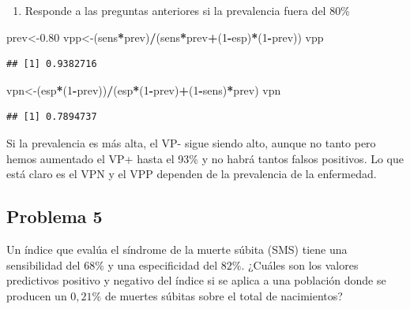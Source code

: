 \documentclass[
]{article}
\newenvironment{Shaded}{\begin{snugshade}}{\end{snugshade}}
\newcommand{\DecValTok}[1]{\textcolor[rgb]{0.00,0.00,0.81}{#1}}
\newcommand{\FloatTok}[1]{\textcolor[rgb]{0.00,0.00,0.81}{#1}}
\newcommand{\NormalTok}[1]{#1}
\newcommand{\OtherTok}[1]{\textcolor[rgb]{0.56,0.35,0.01}{#1}}
\newcommand{\SpecialCharTok}[1]{\textcolor[rgb]{0.81,0.36,0.00}{\textbf{#1}}}
\providecommand{\tightlist}{%
  \setlength{\itemsep}{0pt}\setlength{\parskip}{0pt}}
\begin{document}
\begin{enumerate}
\def\labelenumi{\alph{enumi})}
\setcounter{enumi}{2}
\tightlist
\item
  Responde a las preguntas anteriores si la prevalencia fuera del 80\%
\end{enumerate}

\begin{Shaded}
\begin{Highlighting}[]
\NormalTok{prev}\OtherTok{\textless{}{-}}\FloatTok{0.80}
\NormalTok{vpp}\OtherTok{\textless{}{-}}\NormalTok{(sens}\SpecialCharTok{*}\NormalTok{prev)}\SpecialCharTok{/}\NormalTok{(sens}\SpecialCharTok{*}\NormalTok{prev}\SpecialCharTok{+}\NormalTok{(}\DecValTok{1}\SpecialCharTok{{-}}\NormalTok{esp)}\SpecialCharTok{*}\NormalTok{(}\DecValTok{1}\SpecialCharTok{{-}}\NormalTok{prev))}
\NormalTok{vpp}
\end{Highlighting}
\end{Shaded}

\begin{verbatim}
## [1] 0.9382716
\end{verbatim}

\begin{Shaded}
\begin{Highlighting}[]
\NormalTok{vpn}\OtherTok{\textless{}{-}}\NormalTok{(esp}\SpecialCharTok{*}\NormalTok{(}\DecValTok{1}\SpecialCharTok{{-}}\NormalTok{prev))}\SpecialCharTok{/}\NormalTok{(esp}\SpecialCharTok{*}\NormalTok{(}\DecValTok{1}\SpecialCharTok{{-}}\NormalTok{prev)}\SpecialCharTok{+}\NormalTok{(}\DecValTok{1}\SpecialCharTok{{-}}\NormalTok{sens)}\SpecialCharTok{*}\NormalTok{prev)}
\NormalTok{vpn}
\end{Highlighting}
\end{Shaded}

\begin{verbatim}
## [1] 0.7894737
\end{verbatim}

Si la prevalencia es más alta, el VP- sigue siendo alto, aunque no tanto pero hemos aumentado el VP+ hasta el 93\% y no habrá tantos falsos positivos. Lo que está claro es el VPN y el VPP dependen de la prevalencia de la enfermedad.

\subsection{Problema 5}\label{problema-5}

Un índice que evalúa el síndrome de la muerte súbita (SMS) tiene una sensibilidad del \(68 \%\) y una especificidad del \(82 \%\). ¿Cuáles son los valores predictivos positivo y negativo del índice si se aplica a una población donde se producen un \(0,21 \%\) de muertes súbitas sobre el total de nacimientos?
\end{document}
